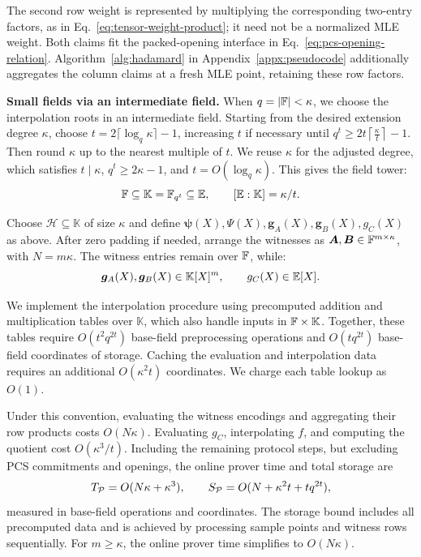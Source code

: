 The second row weight is represented by multiplying the corresponding
two-entry factors, as in Eq.~\eqref{eq:tensor-weight-product};
it need not be a normalized MLE weight.
Both claims fit the packed-opening interface in
Eq.~\eqref{eq:pcs-opening-relation}.
Algorithm~\ref{alg:hadamard} in Appendix~\ref{appx:pseudocode}
additionally aggregates the column claims at a fresh MLE point,
retaining these row factors.
\fi

\smallskip\noindent\textbf{Small fields via an intermediate field.}
When \(q=|{\mathbb{F}}|<\kappa\), we choose the interpolation roots
in an intermediate field.
Starting from the desired extension degree \(\kappa\),
choose \(t=2\lceil\log_q\kappa\rceil-1\), increasing \(t\)
if necessary until
\(
    q^t\ge  2 t\left\lceil\frac{\kappa}{t}\right\rceil - 1.
\)
Then round \(\kappa\) up to the nearest multiple of \(t\).
We reuse \(\kappa\) for the adjusted degree, which satisfies
\(t\mid\kappa\), \(q^t\ge 2\kappa-1\), and
\(t=O(\log_q\kappa)\).
This gives the field tower:
\[
    {\mathbb{F}}\subseteq\mathbb K=\mathbb F_{q^t}
    \subseteq\mathbb{E},
    \qquad
    [\mathbb{E}:\mathbb K]=\kappa/t.
\]

Choose \(\mathcal H\subseteq\mathbb K\) of size \(\kappa\)
and define \(\bm\psi(X),\Psi(X),\bm g_A(X),\bm g_B(X),g_C(X)\) as above.
After zero padding if needed, arrange the witnesses as
\(\bm A,\bm B\in{\mathbb{F}}^{m\times\kappa}\), with \(N=m\kappa\).
The witness entries remain over \({\mathbb{F}}\), while:
\[
    \bm g_A (X),\bm g_B (X)\in\mathbb K[X]^m,
    \qquad
    g_C(X)\in\mathbb{E}[X].
\]

We implement the interpolation procedure using
precomputed addition and multiplication tables over
\(\mathbb K\), which also handle inputs in
\({\mathbb{F}}\times\mathbb K\).
Together, these tables require \(O(t^2q^{2t})\)
base-field preprocessing operations and \(O(tq^{2t})\)
base-field coordinates of storage.
Caching the evaluation and interpolation data requires
an additional \(O(\kappa^2t)\) coordinates.
We charge each table lookup as $O(1)$.

Under this convention, evaluating the witness encodings
and aggregating their row products costs \(O(N\kappa)\).
Evaluating \(g_C\), interpolating \(f\), and computing
the quotient cost \(O(\kappa^3/t)\).
Including the remaining protocol steps, but excluding PCS
commitments and openings, the online prover time and
total storage are
\[
    T_{\mathcal{P}}=O(N\kappa+\kappa^3),
    \qquad
    S_{\mathcal{P}}=O(N+\kappa^2t+tq^{2t}),
\]
measured in base-field operations and coordinates.
The storage bound includes all precomputed data and is
achieved by processing sample points and witness rows
sequentially.
For \(m\ge\kappa\), the online prover time simplifies
to \(O(N\kappa)\).

